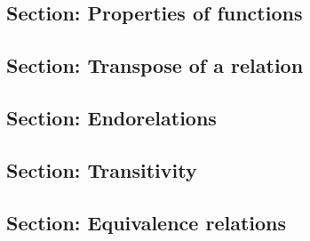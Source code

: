 \begin{forslides}
\begin{equation}
\end{equation}
\begin{equation}\label{slides_session2_204}

\end{equation}
 \begin{equation}\label{slides_session2_205}

\end{equation}
\begin{equation}\label{slides_session2_206}

\end{equation}
 \begin{equation}\label{slides_session2_207}

\end{equation}
\begin{equation}\label{slides_session2_208}

\end{equation}
 \begin{equation}\label{slides_session2_209}

\end{equation}




\subsection{Section: Properties of functions}  

\subsection{Section: Transpose of a relation}  

\subsection{Section: Endorelations}

\subsection{Section: Transitivity} 

\subsection{Section: Equivalence relations}       
 

\end{forslides}
